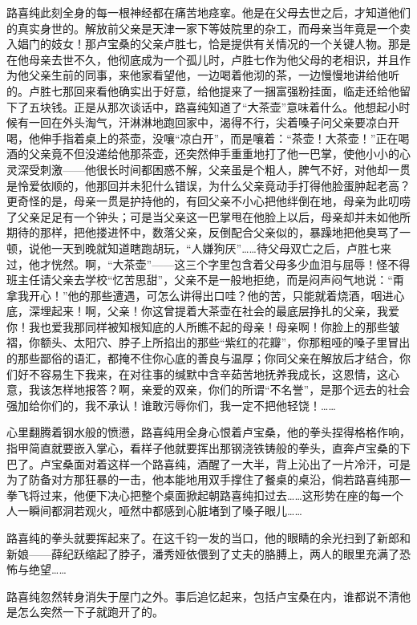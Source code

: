 \par 路喜纯此刻全身的每一根神经都在痛苦地痉挛。他是在父母去世之后，才知道他们的真实身世的。解放前父亲是天津一家下等妓院里的杂工，而母亲当年竟是一个卖入娼门的妓女！那卢宝桑的父亲卢胜七，恰是提供有关情况的一个关键人物。那是在他母亲去世不久，他彻底成为一个孤儿时，卢胜七作为他父母的老相识，并且作为他父亲生前的同事，来他家看望他，一边喝着他沏的茶，一边慢慢地讲给他听的。卢胜七那回来看他确实出于好意，给他提来了一捆富强粉挂面，临走还给他留下了五块钱。正是从那次谈话中，路喜纯知道了“大茶壶”意味着什么。他想起小时候有一回在外头淘气，汗淋淋地跑回家中，渴得不行，尖着嗓子问父亲要凉白开喝，他伸手指着桌上的茶壶，没嚷“凉白开”，而是嚷着：“茶壶！大茶壶！”正在喝酒的父亲竟不但没递给他那茶壶，还突然伸手重重地打了他一巴掌，使他小小的心灵深受刺激——他很长时间都困惑不解，父亲虽是个粗人，脾气不好，对他却一贯是怜爱依顺的，他那回并未犯什么错误，为什么父亲竟动手打得他脸蛋肿起老高？更奇怪的是，母亲一贯是护持他的，有回父亲不小心把他绊倒在地，母亲为此叨唠了父亲足足有一个钟头；可是当父亲这一巴掌甩在他脸上以后，母亲却并未如他所期待的那样，把他搂进怀中，数落父亲，反倒配合父亲似的，暴躁地把他臭骂了一顿，说他一天到晚就知道瞎跑胡玩，“人嫌狗厌”……待父母双亡之后，卢胜七来过，他才恍然。啊，“大茶壶”——这三个字里包含着父母多少血泪与屈辱！怪不得班主任请父亲去学校“忆苦思甜”，父亲不是一般地拒绝，而是闷声闷气地说：“甭拿我开心！”他的那些遭遇，可怎么讲得出口哇？他的苦，只能就着烧酒，咽进心底，深埋起来！啊，父亲！你这曾提着大茶壶在社会的最底层挣扎的父亲，我爱你！我也爱我那同样被知根知底的人所瞧不起的母亲！母亲啊！你脸上的那些皱褶，你额头、太阳穴、脖子上所掐出的那些“紫红的花瓣”，你那粗哑的嗓子里冒出的那些鄙俗的语汇，都掩不住你心底的善良与温厚；你同父亲在解放后才结合，你们好不容易生下我来，在对往事的缄默中含辛茹苦地抚养我成长，这恩情，这心意，我该怎样地报答？啊，亲爱的双亲，你们的所谓“不名誉”，是那个远去的社会强加给你们的，我不承认！谁敢污辱你们，我一定不把他轻饶！……
\par 心里翻腾着钢水般的愤懑，路喜纯用全身心恨着卢宝桑，他的拳头捏得格格作响，指甲简直就要嵌入掌心，看样子他就要挥出那钢浇铁铸般的拳头，直奔卢宝桑的下巴了。卢宝桑面对着这样一个路喜纯，酒醒了一大半，背上沁出了一片冷汗，可是为了防备对方那狂暴的一击，他本能地用双手撑住了餐桌的桌沿，倘若路喜纯那一拳飞将过来，他便下决心把整个桌面掀起朝路喜纯扣过去……这形势在座的每一个人一瞬间都洞若观火，哑然中都感到心脏堵到了嗓子眼儿……
\par 路喜纯的拳头就要挥起来了。在这千钧一发的当口，他的眼睛的余光扫到了新郎和新娘——薛纪跃缩起了脖子，潘秀娅依偎到了丈夫的胳膊上，两人的眼里充满了恐怖与绝望……
\par 路喜纯忽然转身消失于屋门之外。事后追忆起来，包括卢宝桑在内，谁都说不清他是怎么突然一下子就跑开了的。
